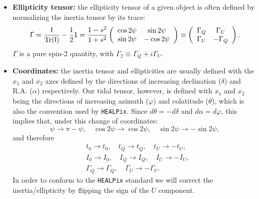 \documentclass{article}
\begin{document}
\begin{itemize}
    \item {\bf Ellipticity tensor:} the ellipticity tensor of a given object is often defined by normalizing the inertia tensor by its trace:
    \begin{equation}
      \mathsf{\Gamma}=\frac{{\sf I}}{{\rm Tr}({\sf I})}-\frac{1}{2}\mathsf{1}=\frac{1-s^2}{1+s^2}
      \left(
      \begin{array}{cc}
       \cos2\psi & \sin2\psi\\
       \sin2\psi & -\cos2\psi
      \end{array}
      \right)\equiv\left(
      \begin{array}{cc}
       \Gamma_Q & \Gamma_U\\
       \Gamma_U & -\Gamma_Q
      \end{array}
      \right).
    \end{equation}
    $\mathsf{\Gamma}$ is a pure spin-2 quantity, with $\Gamma_2\equiv\Gamma_Q+i\Gamma_U$.
    \item {\bf Coordinates:} the inertia tensor and ellipticities are usually defined with the $x_1$ and $x_2$ axes defined by the directions of increasing declination ($\delta$) and R.A. ($\alpha$) respectively. Our tidal tensor, however, is defined with $x_1$ and $x_2$ being the directions of increasing azimuth ($\varphi$) and colatitude ($\theta$), which is also the convention used by {\tt HEALPix}. Since $d\theta=-d\delta$ and $d\alpha=d\varphi$, this implies that, under this change of coordinates:
    \begin{equation}
      \psi\rightarrow\pi-\psi,\hspace{12pt}\cos2\psi\rightarrow\cos2\psi,\hspace{12pt}\sin2\psi\rightarrow-\sin2\psi,
    \end{equation}
    and therefore
    \begin{align}
      &t_0\rightarrow t_0,\hspace{12pt}t_Q\rightarrow t_Q,\hspace{12pt}t_U\rightarrow-t_U,\\
      &I_0\rightarrow I_0,\hspace{12pt}I_Q\rightarrow I_Q,\hspace{12pt}I_U\rightarrow-I_U,\\
      &\Gamma_Q\rightarrow\Gamma_Q,\hspace{12pt}\Gamma_U\rightarrow-\Gamma_U.
    \end{align}
    In order to conform to the {\tt HEALPix} standard we will correct the inertia/ellipticity by flipping the sign of the $U$ component.
  \end{itemize}
\end{document}
